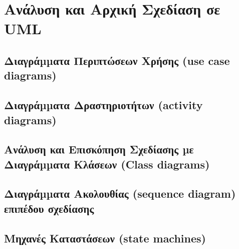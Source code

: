 \section{Ανάλυση και Αρχική Σχεδίαση σε UML}
	
	\subsection{Διαγράµµατα Περιπτώσεων Χρήσης (use case diagrams)}
	\subsection{Διαγράµµατα Δραστηριοτήτων (activity diagrams)}
	\subsection{Ανάλυση και Επισκόπηση Σχεδίασης µε Διαγράµµατα Κλάσεων (Class diagrams)}
	\subsection{Διαγράµµατα Ακολουθίας (sequence diagram) επιπέδου σχεδίασης}
	\subsection{Μηχανές Καταστάσεων (state machines)}

